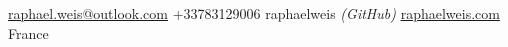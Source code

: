 \documentclass[10pt,a4paper]{article} %
\begin{document}


    \noindent\href{mailto:raphael.weis@outlook.com}{raphael.weis@outlook.com}\bull %
    +33783129006\bull
    raphaelweis \textit{(GitHub)}\bull %
    \href{https://raphaelweis.com}{raphaelweis.com}\bull %
    France\\

    \spacedhrule{0.9em}{-0.4em} %



%
%
%
%
\end{document}
